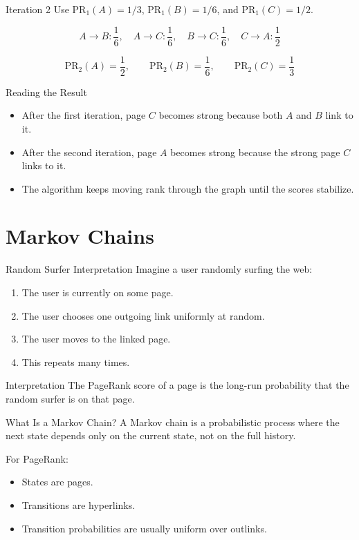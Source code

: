 \documentclass[aspectratio=169,11pt]{beamer}
\newcommand{\PR}{\mathrm{PR}}
\begin{document}
\begin{frame}{Iteration 2}
Use \(\PR_1(A)=1/3\), \(\PR_1(B)=1/6\), and \(\PR_1(C)=1/2\).

\[
A \rightarrow B: \frac{1}{6},
\quad
A \rightarrow C: \frac{1}{6},
\quad
B \rightarrow C: \frac{1}{6},
\quad
C \rightarrow A: \frac{1}{2}
\]

\[
\PR_2(A)=\frac{1}{2},
\qquad
\PR_2(B)=\frac{1}{6},
\qquad
\PR_2(C)=\frac{1}{3}
\]
\end{frame}

\begin{frame}{Reading the Result}
\begin{itemize}
  \item After the first iteration, page \(C\) becomes strong because both \(A\)
  and \(B\) link to it.
  \item After the second iteration, page \(A\) becomes strong because the strong
  page \(C\) links to it.
  \item The algorithm keeps moving rank through the graph until the scores
  stabilize.
\end{itemize}
\end{frame}

\section{Markov Chains}

\begin{frame}{Random Surfer Interpretation}
Imagine a user randomly surfing the web:
\begin{enumerate}
  \item The user is currently on some page.
  \item The user chooses one outgoing link uniformly at random.
  \item The user moves to the linked page.
  \item This repeats many times.
\end{enumerate}

\begin{block}{Interpretation}
The PageRank score of a page is the long-run probability that the random surfer
is on that page.
\end{block}
\end{frame}

\begin{frame}{What Is a Markov Chain?}
A Markov chain is a probabilistic process where the next state depends only on
the current state, not on the full history.

\vspace{0.5em}
For PageRank:
\begin{itemize}
  \item States are pages.
  \item Transitions are hyperlinks.
  \item Transition probabilities are usually uniform over outlinks.
\end{itemize}
\end{frame}
\end{document}
